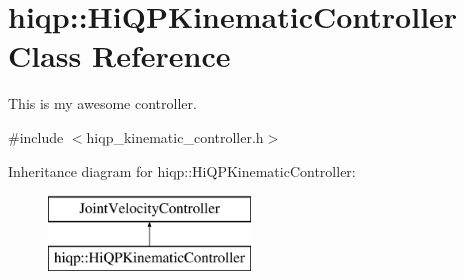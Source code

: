 \hypertarget{classhiqp_1_1HiQPKinematicController}{\section{hiqp\-:\-:Hi\-Q\-P\-Kinematic\-Controller Class Reference}
\label{classhiqp_1_1HiQPKinematicController}
}


This is my awesome controller.  




{\ttfamily \#include $<$hiqp\-\_\-kinematic\-\_\-controller.\-h$>$}

Inheritance diagram for hiqp\-:\-:Hi\-Q\-P\-Kinematic\-Controller\-:\begin{figure}[H]
\begin{center}
\leavevmode
\includegraphics[height=2.000000cm]{classhiqp_1_1HiQPKinematicController}
\end{center}
\end{figure}
